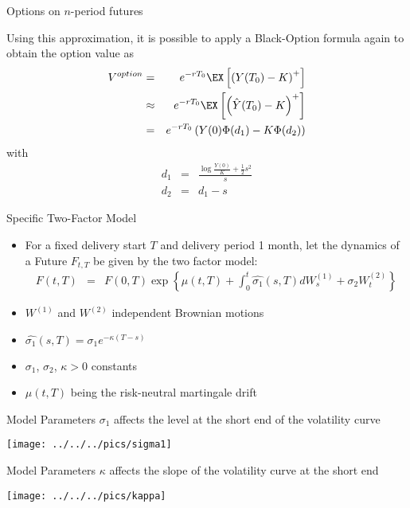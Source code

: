 {Options on $n$-period futures}

Using this approximation, it
is possible to apply a Black-Option formula again to obtain the
option value as
\begin{eqnarray}\label{eq:approx-option}
V^{option} & = & e^{-rT_0} \EX \left[\left(Y(T_0)-K\right)^+\right] \nonumber \\
& \approx & e^{-rT_0} \EX \left[\left(\hat{Y}(T_0)-K\right)^+\right]\nonumber \\
& = &  e^{-rT_0} \left(Y(0)\Phi(d_1)-K\Phi(d_2)\right)
\end{eqnarray}
with
\begin{eqnarray*}
d_1& = & \frac{\log \frac{Y(0)}{K}+\frac{1}{2}s^2}{s}\\
d_2 & = & d_1 - s
\end{eqnarray*}




{Specific  Two-Factor Model}

\begin{itemize}
\item<1-> For a fixed delivery start $T$ and delivery period 1 month, let the dynamics of a Future $F_{t,T}$ be given by the two factor model:
\begin{eqnarray*}
F(t,T)& =&F(0,T)\exp\left\{\mu(t,T)  +\int_0^t\hat{\sigma_1}(s,T)dW_s^{(1)}+\sigma_2W_t^{(2)}\right\}
\end{eqnarray*}

\item<2-> $W^{(1)}$ and $W^{(2)}$ independent Brownian motions
\item<3-> $\hat{\sigma_1}(s,T)=\sigma_1e^{-\kappa(T-s)}$
\item<4-> $\sigma_1$, $\sigma_2$, $\kappa>0$ constants
\item<5-> $\mu(t,T)$ being the risk-neutral martingale drift
\end{itemize}



{Model Parameters}
$\sigma_1$ affects the level at the short end of the volatility curve

\begin{center}
\texttt{[image: ../../../pics/sigma1]}
\end{center}




{Model Parameters}
$\kappa$ affects the slope of the volatility curve at the short end

\begin{center}
\texttt{[image: ../../../pics/kappa]}
\end{center}




